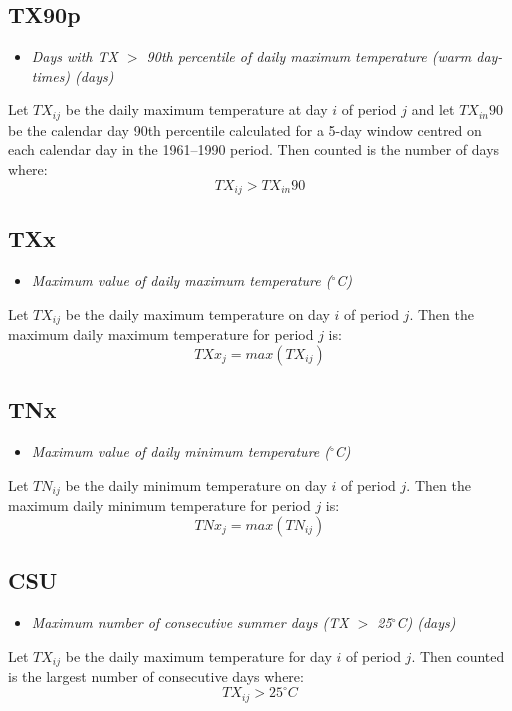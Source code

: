 \documentclass[a4paper,11pt]{article}
\begin{document}
\subsection*{TX90p}
\begin{itemize}
\item \textit{Days with TX $>$ 90th percentile of daily maximum
temperature (warm day-times) (days)}
\end{itemize}
Let $TX_{ij}$ be the daily maximum temperature at day $i$ of period
$j$ and let $TX_{in}90$ be the calendar day 90th percentile calculated
for a 5-day window centred on each calendar day in the 1961--1990
period. Then counted is the number of days where:
\begin{equation*}
TX_{ij} > TX_{in}90
\end{equation*}

\subsection*{TXx}
\begin{itemize}
\item \textit{Maximum value of daily maximum temperature ($^\circ$C)}
\end{itemize}
Let $TX_{ij}$ be the daily maximum temperature on day $i$ of period
$j$. Then the maximum daily maximum temperature for period $j$ is:
\begin{equation*}
TXx_{j} = max(TX_{ij})
\end{equation*}

\subsection*{TNx}
\begin{itemize}
\item \textit{Maximum value of daily minimum temperature ($^\circ$C)}
\end{itemize}
Let $TN_{ij}$ be the daily minimum temperature on day $i$ of period
$j$. Then the maximum daily minimum temperature for period $j$ is:
\begin{equation*}
TNx_{j} = max(TN_{ij})
\end{equation*}

\subsection*{CSU}
\begin{itemize}
\item \textit{Maximum number of consecutive summer days (TX $>$ 25$^\circ$C) (days)}
\end{itemize}
Let $TX_{ij}$ be the daily maximum temperature for day $i$ of period
$j$. Then counted is the largest number of consecutive days where:
\begin{equation*}
TX_{ij} > 25^\circ C
\end{equation*}
\end{document}
